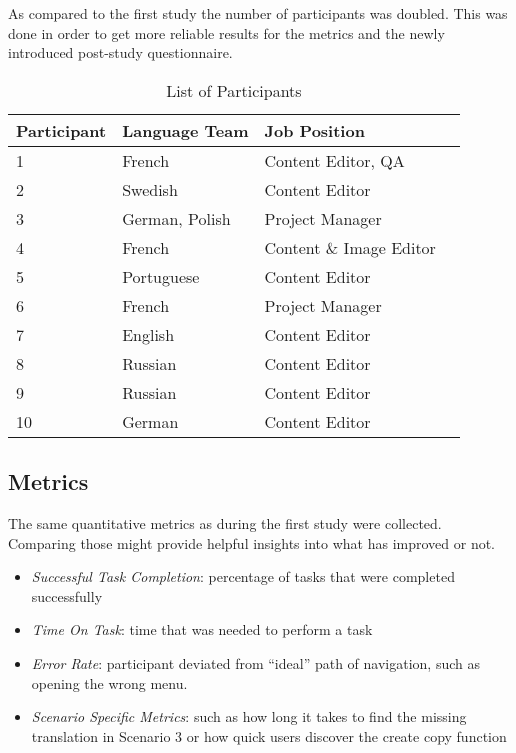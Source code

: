 As compared to the first study the number of participants was doubled. This was done in order to get more reliable results for the metrics and the newly introduced post-study questionnaire.

\begin{table}[h!]
\centering
\begin{tabular}{|l|l|l|l|}
\hline
\rowcolor[HTML]{EFEFEF}
{\bf Participant} & {\bf Language Team} & {\bf Job Position} \\ \hline
1 & French & Content Editor, QA \\ \hline
2 & Swedish & Content Editor \\ \hline
3 & German, Polish & Project Manager \\ \hline
4 & French & Content \& Image Editor \\ \hline
5 & Portuguese & Content Editor \\ \hline
6 & French & Project Manager \\ \hline
7 & English & Content Editor \\ \hline
8 & Russian & Content Editor \\ \hline
9 & Russian & Content Editor \\ \hline
10 & German & Content Editor \\ \hline
\end{tabular}
\caption{List of Participants}
\label{table:participants-study2}
\end{table}


\subsection{Metrics}
The same quantitative metrics as during the first study were collected. Comparing those might provide helpful insights into what has improved or not.

\begin{itemize}
 \item{\emph{Successful Task Completion}: percentage of tasks that were completed successfully}
 \item{\emph{Time On Task}: time that was needed to perform a task}
 \item{\emph{Error Rate}: participant deviated from “ideal” path of navigation, such as opening the wrong menu.}
 \item{\emph{Scenario Specific Metrics}: such as how long it takes to find the missing translation in Scenario 3 or how quick users discover the create copy function}
\end{itemize}

